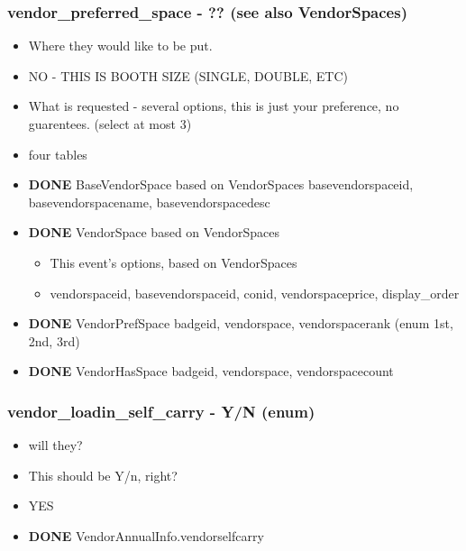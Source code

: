 \documentclass[captions=tablesignature]{scrartcl}
\begin{document}
\subsubsection{vendor\_preferred\_space - ?? (see also VendorSpaces)}
\label{sec-2-2-18}
\begin{itemize}
\item Where they would like to be put.
\item NO - THIS IS BOOTH SIZE (SINGLE, DOUBLE, ETC)
\item What is requested - several options, this is just your
preference, no guarentees.  (select at most 3)
\item four tables
\end{itemize}
\begin{itemize}
\item {\bfseries\sffamily DONE} BaseVendorSpace based on VendorSpaces
\label{sec-2-2-18-1}
basevendorspaceid, basevendorspacename, basevendorspacedesc

\item {\bfseries\sffamily DONE} VendorSpace based on VendorSpaces
\label{sec-2-2-18-2}
\begin{itemize}
\item This event's options, based on VendorSpaces
\item vendorspaceid, basevendorspaceid, conid, vendorspaceprice,
display\_order
\end{itemize}

\item {\bfseries\sffamily DONE} VendorPrefSpace
\label{sec-2-2-18-3}
badgeid, vendorspace, vendorspacerank (enum 1st, 2nd, 3rd)

\item {\bfseries\sffamily DONE} VendorHasSpace
\label{sec-2-2-18-4}
badgeid, vendorspace, vendorspacecount
\end{itemize}

\subsubsection{vendor\_loadin\_self\_carry - Y/N (enum)}
\label{sec-2-2-19}
\begin{itemize}
\item will they?
\item This should be Y/n, right?
\item YES
\end{itemize}
\begin{itemize}
\item {\bfseries\sffamily DONE} VendorAnnualInfo.vendorselfcarry
\label{sec-2-2-19-1}
\end{itemize}
\end{document}
